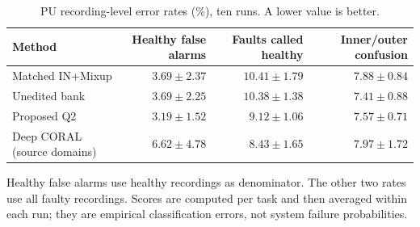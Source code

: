 \begin{table}[pos=htbp]
\centering\small
\caption{PU recording-level error rates (\%), ten runs. A lower value is better.}
\label{tab:errors}
\begin{tabular}{lrrr}
\toprule
Method & Healthy false alarms & Faults called healthy & Inner/outer confusion\\
\midrule
Matched IN+Mixup & $3.69\pm2.37$ & $10.41\pm1.79$ & $7.88\pm0.84$\\
Unedited bank & $3.69\pm2.25$ & $10.38\pm1.38$ & $7.41\pm0.88$\\
Proposed Q2 & $3.19\pm1.52$ & $9.12\pm1.06$ & $7.57\pm0.71$\\
Deep CORAL (source domains) & $6.62\pm4.78$ & $8.43\pm1.65$ & $7.97\pm1.72$\\
\bottomrule
\end{tabular}
\par\medskip\begin{minipage}{.98\linewidth}\footnotesize Healthy false alarms use healthy recordings as denominator. The other two rates use all faulty recordings. Scores are computed per task and then averaged within each run; they are empirical classification errors, not system failure probabilities.\end{minipage}
\end{table}
